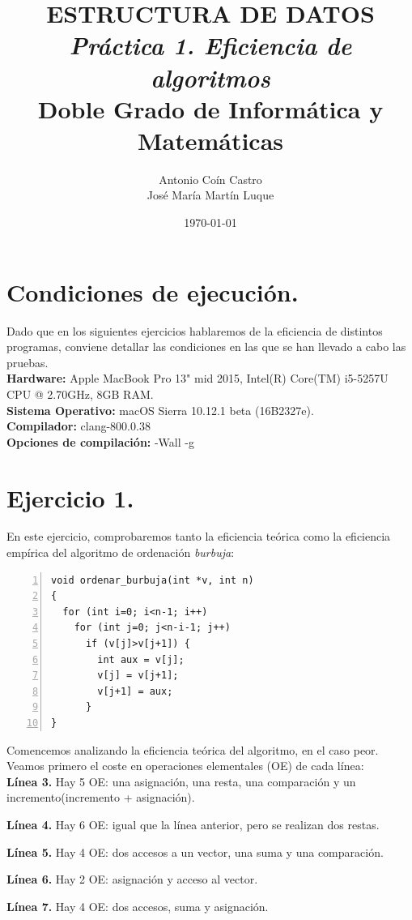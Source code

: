 \documentclass[11pt,a4paper]{article}
\title{\textbf{ESTRUCTURA DE DATOS}\\
	   \textit{Práctica 1. Eficiencia de algoritmos}\\
	   \large \vspace{0.25em} Doble Grado de Informática y Matemáticas}
\author{Antonio Coín Castro\\ José María Martín Luque}
\date{\today}
\begin{document}
\maketitle

\section*{Condiciones de ejecución.}

Dado que en los siguientes ejercicios hablaremos de la eficiencia de distintos programas, conviene detallar las condiciones en las que se han llevado a cabo las pruebas. \\

\textbf{Hardware:} Apple MacBook Pro 13" mid 2015, Intel(R) Core(TM) i5-5257U CPU @ 2.70GHz, 8GB RAM. \\
\textbf{Sistema Operativo:} macOS Sierra 10.12.1 beta (16B2327e). \\
\textbf{Compilador:} clang-800.0.38 \\
\textbf{Opciones de compilación:} -Wall -g

\section*{Ejercicio 1.}
En este ejercicio, comprobaremos tanto la eficiencia teórica como la eficiencia empírica del algoritmo de ordenación \emph{burbuja}:

\begin{lstlisting}[numbers=left]
void ordenar_burbuja(int *v, int n)
{
  for (int i=0; i<n-1; i++)
    for (int j=0; j<n-i-1; j++)
      if (v[j]>v[j+1]) {
        int aux = v[j];
        v[j] = v[j+1];
        v[j+1] = aux;
      }
}
\end{lstlisting}

Comencemos analizando la eficiencia teórica del algoritmo, en el caso peor. Veamos primero el coste en operaciones elementales (OE) de cada línea:\\

\textbf{Línea 3.} Hay 5 OE: una asignación, una resta, una comparación y un incremento(incremento + asignación).

\textbf{Línea 4.} Hay 6 OE: igual que la línea anterior, pero se realizan dos restas.

\textbf{Línea 5.} Hay 4 OE: dos accesos a un vector, una suma y una comparación.

\textbf{Línea 6.} Hay 2 OE: asignación y acceso al vector.

\textbf{Línea 7.} Hay 4 OE: dos accesos, suma y asignación.
\end{document}
